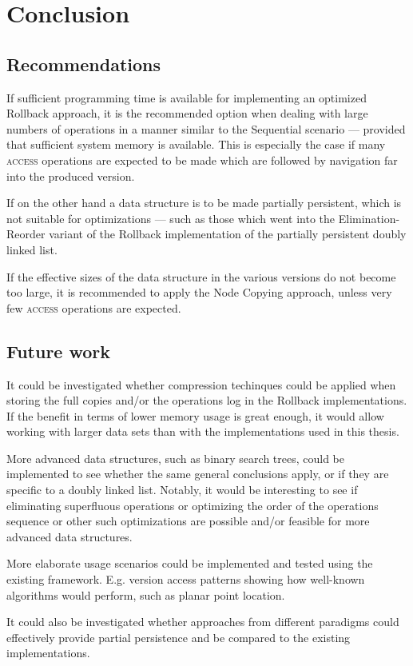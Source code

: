 \chapter{Conclusion}
\label{chapter:conclusion}

\section{Recommendations}
If sufficient programming time is available for implementing an optimized
Rollback approach, it is the recommended option when dealing with large numbers
of operations in a manner similar to the Sequential scenario --- provided that
sufficient system memory is available. This is especially the case if many
\textsc{access} operations are expected to be made which are followed by
navigation far into the produced version.

If on the other hand a data structure is to be made partially persistent, which
is not suitable for optimizations --- such as those which went into the
Elimination-Reorder variant of the Rollback implementation of the partially
persistent doubly linked list.

If the effective sizes of the data structure in the various versions do not
become too large, it is recommended to apply the Node Copying approach, unless
very few \textsc{access} operations are expected.

\section{Future work}
It could be investigated whether compression techinques could be applied when
storing the full copies and/or the operations log in the Rollback
implementations. If the benefit in terms of lower memory usage is great enough,
it would allow working with larger data sets than with the implementations used
in this thesis.

More advanced data structures, such as binary search trees, could be implemented
to see whether the same general conclusions apply, or if they are specific to a
doubly linked list. Notably, it would be interesting to see if eliminating
superfluous operations or optimizing the order of the operations sequence or
other such optimizations are possible and/or feasible for more advanced data
structures.

More elaborate usage scenarios could be implemented and tested using the
existing framework. E.g. version access patterns showing how well-known
algorithms would perform, such as planar point location.

It could also be investigated whether approaches from different paradigms could
effectively provide partial persistence and be compared to the existing
implementations.

